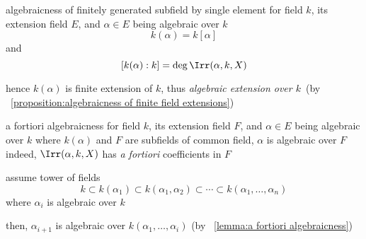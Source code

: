\documentclass[17pt,landscape]{foils}
\begin{document}
{

\begin{myproposition}{algebraicness of finitely generated subfield by single element}%
	for field $k$, its extension field $E$, and $\alpha\in E$ being algebraic over $k$
	$$k(\alpha) = k[\alpha]$$
	and
	$$
		[k(\alpha):k] = \deg \Irr(\alpha, k, X)
	$$

	hence $k(\alpha)$ is finite extension of $k$,
	thus \emph{algebraic extension over $k$}\
	(by \propositionname~\ref{proposition:algebraicness of finite field extensions})
\end{myproposition}

\vfill
\begin{mylemma}{a fortiori algebraicness}%
	for field $k$,
	its extension field $F$,
	and $\alpha\in E$ being algebraic over $k$
	where $k(\alpha)$ and $F$ are subfields of common field,
	$\alpha$ is algebraic over $F$
	\shrinkspacewithintheoremslike\
	\ibit
	\iitem
		indeed, $\Irr(\alpha,k,X)$
		has \emph{a fortiori}
		coefficients in $F$
	\eit
\end{mylemma}


\myfoilhead{}

\bit
\item
	assume tower of fields
	$$
		k \subset k(\alpha_1) \subset k(\alpha_1, \alpha_2) \subset \cdots \subset k(\alpha_1,\ldots, \alpha_n)
	$$
	where $\alpha_i$ is algebraic over $k$

\vitem
	then, $\alpha_{i+1}$ is algebraic over $k(\alpha_1,\ldots,\alpha_i)$ (by \lemmaname~\ref{lemma:a fortiori algebraicness})
\eit

}
\end{document}
